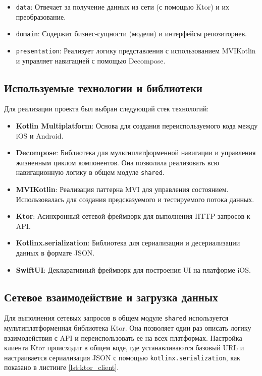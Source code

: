 \documentclass[14pt, russian]{scrartcl}
\begin{document}
\begin{itemize}
    \item \texttt{data}: Отвечает за получение данных из сети (с помощью Ktor) и их преобразование.
    \item \texttt{domain}: Содержит бизнес-сущности (модели) и интерфейсы репозиториев.
    \item \texttt{presentation}: Реализует логику представления с использованием MVIKotlin и управляет навигацией с помощью Decompose.
\end{itemize}

\subsection{Используемые технологии и библиотеки}

Для реализации проекта был выбран следующий стек технологий:

\begin{itemize}
    \item \textbf{Kotlin Multiplatform}: Основа для создания переиспользуемого кода между iOS и Android.
    \item \textbf{Decompose}: Библиотека для мультиплатформенной навигации и управления жизненным циклом компонентов. Она позволила реализовать всю навигационную логику в общем модуле \texttt{shared}.
    \item \textbf{MVIKotlin}: Реализация паттерна MVI для управления состоянием. Использовалась для создания предсказуемого и тестируемого потока данных.
    \item \textbf{Ktor}: Асинхронный сетевой фреймворк для выполнения HTTP-запросов к API.
    \item \textbf{Kotlinx.serialization}: Библиотека для сериализации и десериализации данных в формате JSON.
    \item \textbf{SwiftUI}: Декларативный фреймворк для построения UI на платформе iOS.
\end{itemize}

\subsection{Сетевое взаимодействие и загрузка данных}

Для выполнения сетевых запросов в общем модуле \texttt{shared} используется мультиплатформенная библиотека Ktor. Она позволяет один раз описать логику взаимодействия с API и переиспользовать ее на всех платформах. Настройка клиента Ktor происходит в общем коде, где устанавливаются базовый URL и настраивается сериализация JSON с помощью \texttt{kotlinx.serialization}, как показано в листинге \ref{lst:ktor_client}.
\end{document}
